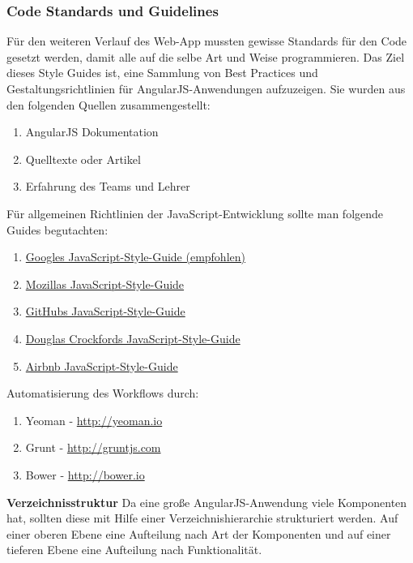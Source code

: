 \subsubsection{Code Standards und Guidelines}

Für den weiteren Verlauf des Web-App mussten gewisse Standards für den Code gesetzt werden, damit alle auf die selbe Art und Weise programmieren. Das Ziel dieses Style Guides ist, eine Sammlung von Best Practices und Gestaltungsrichtlinien für AngularJS-Anwendungen aufzuzeigen. Sie wurden aus den folgenden Quellen zusammengestellt:

\begin{enumerate}
\def\labelenumi{\arabic{enumi}.}
\item AngularJS Dokumentation
\item Quelltexte oder Artikel
\item Erfahrung des Teams und Lehrer
\end{enumerate}

Für allgemeinen Richtlinien der JavaScript-Entwicklung sollte man folgende Guides begutachten:

\begin{enumerate}
\def\labelenumi{\arabic{enumi}.}
\item \href{http://google-styleguide.googlecode.com/svn/trunk/javascriptguide.xml}{Googles JavaScript-Style-Guide (empfohlen)}
\item \href{https://developer.mozilla.org/en-US/docs/Developer_Guide/Coding_Style}{Mozillas JavaScript-Style-Guide}
\item \href{https://github.com/styleguide/javascript}{GitHubs JavaScript-Style-Guide}
\item \href{http://javascript.crockford.com/code.html}{Douglas Crockfords JavaScript-Style-Guide}
\item \href{https://github.com/airbnb/javascript}{Airbnb JavaScript-Style-Guide}
\end{enumerate}

Automatisierung des Workflows durch: 
\begin{enumerate}
\item Yeoman - \url{http://yeoman.io}
\item Grunt - \url{http://gruntjs.com}
\item Bower - \url{http://bower.io}
\end{enumerate}

\clearpage

\textbf{Verzeichnisstruktur\newline}
Da eine große AngularJS-Anwendung viele Komponenten hat, sollten diese mit Hilfe einer Verzeichnishierarchie strukturiert werden. Auf einer oberen Ebene eine Aufteilung nach Art der Komponenten und auf einer tieferen Ebene eine Aufteilung nach Funktionalität.

